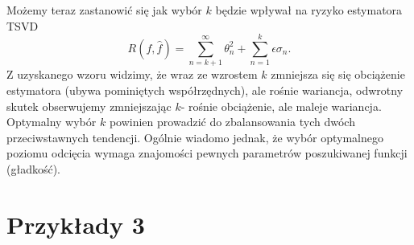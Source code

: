 \documentclass[12pt]{article}
\begin{document}
Możemy teraz zastanowić się jak wybór $k$ będzie wpływał na ryzyko estymatora TSVD
\begin{displaymath}
R(f,\hat{f})=\sum_{n=k+1}^{\infty}\theta_n^2+\sum_{n=1}^k\epsilon\sigma_n.
\end{displaymath}
Z uzyskanego wzoru widzimy, że wraz ze wzrostem $k$ zmniejsza się się obciążenie estymatora (ubywa pominiętych współrzędnych), ale rośnie wariancja, odwrotny skutek obserwujemy zmniejszając $k$- rośnie obciążenie, ale maleje wariancja. Optymalny wybór $k$ powinien prowadzić do zbalansowania tych dwóch przeciwstawnych tendencji. Ogólnie wiadomo jednak, że wybór optymalnego poziomu odcięcia wymaga znajomości pewnych parametrów poszukiwanej funkcji (gładkość).
\section{Przykłady 3}
\end{document}
